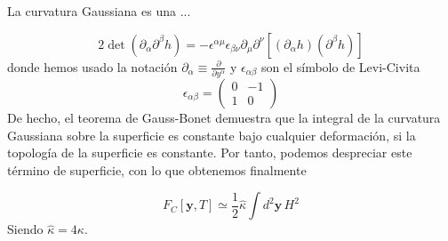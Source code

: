 La curvatura Gaussiana es una ...

\begin{equation}
2\det(\partial_{\alpha}\partial^{\beta}h)=
-\epsilon^{\alpha\mu}\epsilon_{\beta\nu}\partial_{\mu}\partial^{\nu}[(\partial_{\alpha}h)(\partial^{\beta}h)]
\end{equation}
donde hemos usado la notación $\partial_{\alpha}\equiv\frac{\partial}{\partial
  y^{\alpha}}$ y $\epsilon_{\alpha\beta}$ son el símbolo de Levi-Civita
\begin{equation}
\epsilon_{\alpha\beta}=\left(\begin{array}{cc}
0 & -1\\
1 & 0
\end{array}\right)
\end{equation}
De hecho, el teorema de Gauss-Bonet demuestra que la integral de la curvatura
Gaussiana sobre la superficie es constante bajo cualquier deformación, si la
topología de la superficie es constante. Por tanto, podemos despreciar este
término de superficie, con lo que obtenemos finalmente 

\begin{equation}
F_C[\mathbf{y},T]\simeq\frac{1}{2}\hat{\kappa}\int d^2\mathbf{y}\, H^2
\end{equation} 
Siendo $\hat{\kappa}=4\kappa$. 


